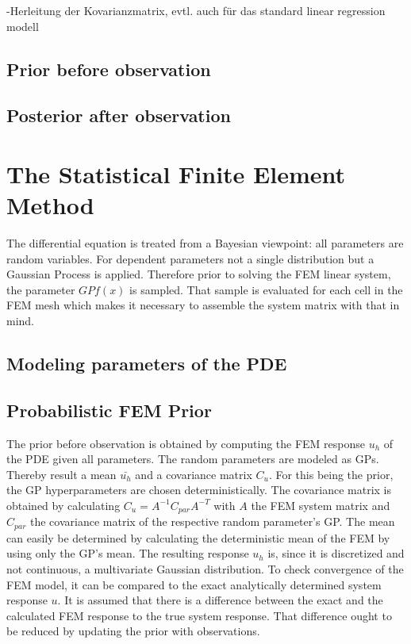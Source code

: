 \documentclass[%
  a4paper,oneside,%
  11pt,%
  smallchapters,
  green,%
  rgb, <cmyk>
  ,]{tubsbook}
\begin{document}
-Herleitung der Kovarianzmatrix, evtl. auch für das standard linear regression modell


\subsection{Prior before observation}

\subsection{Posterior after observation}

\section{The Statistical Finite Element Method}
The differential equation is treated from a Bayesian viewpoint: all parameters are random variables. For dependent parameters not a single distribution but a Gaussian Process is applied. Therefore prior to solving the FEM linear system, the parameter $GP f(x)$ is sampled. That sample is evaluated for each cell in the FEM mesh which makes it necessary to assemble the system matrix with that in mind.

\subsection{Modeling parameters of the PDE}

\subsection{Probabilistic FEM Prior}
The prior before observation is obtained by computing the FEM response $u_h$ of the PDE given all parameters. The random parameters are modeled as GPs. Thereby result a mean $\bar{u_h}$ and a covariance matrix $C_u$. For this being the prior, the GP hyperparameters are chosen deterministically. The covariance matrix is obtained by calculating $C_u = A^{-1} C_{par} A^{-T}$ with $A$ the FEM system matrix and $C_{par}$ the covariance matrix of the respective random parameter's GP. The mean can easily be determined by calculating the deterministic mean of the FEM by using only the GP's mean.
The resulting response $u_h$ is, since it is discretized and not continuous, a multivariate Gaussian distribution.
%
To check convergence of the FEM model, it can be compared to the exact analytically determined system response $u$. 
%
It is assumed that there is a difference between the exact and the calculated FEM response to the true system response. That difference ought to be reduced by updating the prior with observations.
\end{document}
